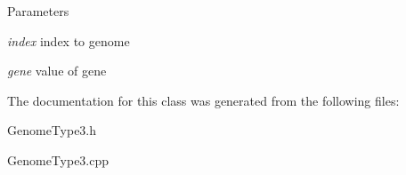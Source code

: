 \begin{DoxyParams}{Parameters}
\item[{\em index}]index to genome \item[{\em gene}]value of gene \end{DoxyParams}


The documentation for this class was generated from the following files:\begin{DoxyCompactItemize}
\item 
GenomeType3.h\item 
GenomeType3.cpp\end{DoxyCompactItemize}
